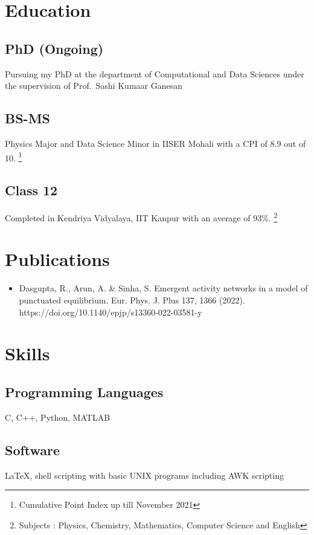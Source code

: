 \documentclass{article}
\begin{document}
\section{Education}

\subsection{PhD (Ongoing)}
Pursuing my PhD at the
department of Computational and Data Sciences
under the supervision of Prof.~Sashi Kumaar Ganesan

\subsection{BS-MS}
Physics Major and Data Science Minor
in IISER Mohali with a CPI of 8.9 out of 10.
\footnote{Cumulative Point Index up till November 2021}

\subsection{Class 12} 
Completed in Kendriya Vidyalaya, IIT Kanpur
with an average of 93\%.
\footnote{Subjects : Physics, Chemistry, Mathematics, Computer Science and English}

\section{Publications}

\begin{itemize}
  \item
Dasgupta, R., Arun, A. \& Sinha, S. Emergent activity networks in a model of punctuated equilibrium. Eur. Phys. J. Plus 137, 1366 (2022). https://doi.org/10.1140/epjp/s13360-022-03581-y
\end{itemize}

\section{Skills}

\subsection{Programming Languages}
C, C++, Python, MATLAB

\subsection{Software}
\LaTeX,
shell scripting with basic UNIX programs
including AWK scripting
\end{document}
